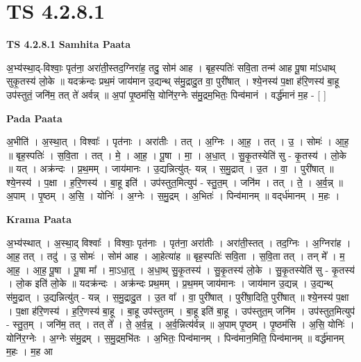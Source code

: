 \documentclass[17pt]{extarticle}
\begin{document}
\section{ TS 4.2.8.1 }

\textbf{TS 4.2.8.1 } \newline
\textbf{Samhita Paata} \newline

अ॒भ्य॑स्था॒द्-विश्वाः॒ पृत॑ना॒ अरा॑ती॒स्तद॒ग्निरा॑ह॒ तदु॒ सोम॑ आह । बृह॒स्पतिः॑ सवि॒ता तन्म॑ आह पू॒षा मा॑ऽधाथ् सुकृ॒तस्य॑ लो॒के ॥ यदक्र॑न्दः प्रथ॒मं जाय॑मान उ॒द्यन्थ् स॑मु॒द्रादु॒त वा॒ पुरी॑षात् । श्ये॒नस्य॑ प॒क्षा ह॑रि॒णस्य॑ बा॒हू उप॑स्तुतं॒ जनि॑म॒ तत् ते॑ अर्वन्न् ॥ अ॒पां पृ॒ष्ठम॑सि॒ योनि॑र॒ग्नेः स॑मु॒द्रम॒भितः॒ पिन्व॑मानं । वर्द्ध॑मानं म॒ह - [  ] \newline

\textbf{Pada Paata} \newline

अ॒भीति॑ । अ॒स्था॒त् । विश्वाः᳚ । पृत॑नाः । अरा॑तीः । तत् । अ॒ग्निः । आ॒ह॒ । तत् । उ॒ । सोमः॑ । आ॒ह॒ ॥ बृह॒स्पतिः॑ । स॒वि॒ता । तत् । मे॒ । आ॒ह॒ । पू॒षा । मा॒ । अ॒धा॒त् । सु॒कृ॒तस्येति॑ सु - कृ॒तस्य॑ । लो॒के ॥ यत् । अक्र॑न्दः । प्र॒थ॒मम् । जाय॑मानः । उ॒द्यन्नित्यु॑त्- यन्न् । स॒मु॒द्रात् । उ॒त । वा॒ । पुरी॑षात् ॥ श्ये॒नस्य॑ । प॒क्षा । ह॒रि॒णस्य॑ । बा॒हू इति॑ । उप॑स्तुत॒मित्युप॑ - स्तु॒त॒म् । जनि॑म । तत् । ते॒ । अ॒र्व॒न्न् ॥ अ॒पाम् । पृ॒ष्ठम् । अ॒सि॒ । योनिः॑ । अ॒ग्नेः । स॒मु॒द्रम् । अ॒भितः॑ । पिन्व॑मानम् ॥ वद्‌र्ध॑मानम् । म॒हः ।  \newline


\textbf{Krama Paata} \newline

अ॒भ्य॑स्थात् । अ॒स्था॒द् विश्वाः᳚ । विश्वाः॒ पृत॑नाः । पृत॑ना॒ अरा॑तीः । अरा॑ती॒स्तत् । तद॒ग्निः । अ॒ग्निरा॑ह । आ॒ह॒ तत् । तदु॑ । उ॒ सोमः॑ । सोम॑ आह । आ॒हेत्या॑ह ॥ बृह॒स्पतिः॑ सवि॒ता । स॒वि॒ता तत् । तन् मे᳚ । म॒ आ॒ह॒ । आ॒ह॒ पू॒षा । पू॒षा मा᳚ । मा॒ऽधा॒त्॒ । अ॒धा॒थ् सु॒कृ॒तस्य॑ । सु॒कृ॒तस्य॑ लो॒के । सु॒कृ॒तस्येति॑ सु - कृ॒तस्य॑ । लो॒क इति॑ लो॒के ॥ यदक्र॑न्दः । अक्र॑न्दः प्रथ॒मम् । प्र॒थ॒मम् जाय॑मानः । जाय॑मान उ॒द्यन्न् । उ॒द्यन्थ् स॑मु॒द्रात् । उ॒द्यन्नित्यु॑त् - यन्न् । स॒मु॒द्रादु॒त । उ॒त वा᳚ । वा॒ पुरी॑षात् । पुरी॑षा॒दिति॒ पुरी॑षात् ॥ श्ये॒नस्य॑ प॒क्षा । प॒क्षा ह॑रि॒णस्य॑ । ह॒रि॒णस्य॑ बा॒हू । बा॒हू उप॑स्तुतम् । बा॒हू इति॑ बा॒हू । उप॑स्तुत॒म् जनि॑म । उप॑स्तुत॒मित्युप॑ - स्तु॒त॒म् । जनि॑म॒ तत् । तत् ते᳚ । ते॒ अ॒र्व॒न्न्॒ । अ॒र्व॒न्नित्य॑र्वन्न् ॥ अ॒पाम् पृ॒ष्ठम् । पृ॒ष्ठम॑सि । अ॒सि॒ योनिः॑ । योनि॑र॒ग्नेः । अ॒ग्नेः स॑मु॒द्रम् । स॒मु॒द्रम॒भि॑तः । अ॒भितः॒ पिन्व॑मानम् । पिन्व॑मान॒मिति॒ पिन्व॑मानम् ॥ वर्द्ध॑मानम् म॒हः । म॒ह आ \newline
\end{document}
